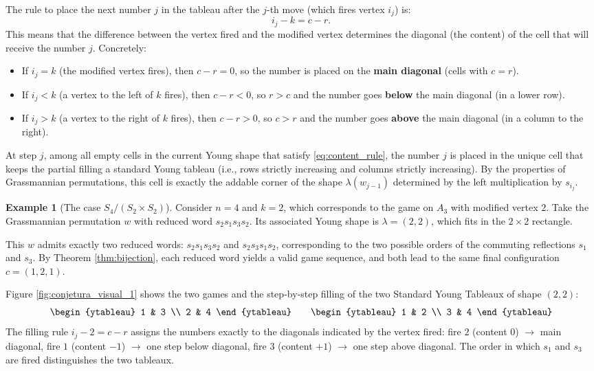 \documentclass[11pt,a4paper]{amsart}
\theoremstyle{plain}
\theoremstyle{definition}
\newtheorem{example}[theorem]{Example}
\theoremstyle{remark}
\begin{document}
The rule to place the next number $j$ in the tableau after the $j$-th move (which fires vertex $i_j$) is:
\begin{equation}\label{eq:content_rule}
    i_j - k = c - r.
\end{equation}
This means that the difference between the vertex fired and the modified vertex determines the diagonal (the content) of the cell that will receive the number $j$. Concretely:
\begin{itemize}
    \item If $i_j = k$ (the modified vertex fires), then $c - r = 0$, so the number is placed on the \textbf{main diagonal} (cells with $c = r$).
    \item If $i_j < k$ (a vertex to the left of $k$ fires), then $c - r < 0$, so $r > c$ and the number goes \textbf{below} the main diagonal (in a lower row).
    \item If $i_j > k$ (a vertex to the right of $k$ fires), then $c - r > 0$, so $c > r$ and the number goes \textbf{above} the main diagonal (in a column to the right).
\end{itemize}

At step $j$, among all empty cells in the current Young shape that satisfy \eqref{eq:content_rule}, the number $j$ is placed in the unique cell that keeps the partial filling a standard Young tableau (i.e., rows strictly increasing and columns strictly increasing). By the properties of Grassmannian permutations, this cell is exactly the addable corner of the shape $\lambda(w_{j-1})$ determined by the left multiplication by $s_{i_j}$.

\begin{example}[The case $S_4 / (S_2 \times S_2)$]
	Consider $n=4$ and $k=2$, which corresponds to the game on $A_3$ with modified vertex $2$. Take the Grassmannian permutation $w$ with reduced word $s_2 s_1 s_3 s_2$. Its associated Young shape is $\lambda = (2,2)$, which fits in the $2 \times 2$ rectangle.
	
	This $w$ admits exactly two reduced words: $s_2 s_1 s_3 s_2$ and $s_2 s_3 s_1 s_2$, corresponding to the two possible orders of the commuting reflections $s_1$ and $s_3$. By Theorem \ref{thm:bijection}, each reduced word yields a valid game sequence, and both lead to the same final configuration $c = (1,2,1)$.
	
	Figure \ref{fig:conjetura_visual_1} shows the two games and the step‑by‑step filling of the two Standard Young Tableaux of shape $(2,2)$:
	\[
	\begin{ytableau}
    1 & 3 \\
    2 & 4
    \end{ytableau}
    \qquad
    \begin{ytableau}
    1 & 2 \\
    3 & 4
    \end{ytableau}
    \]
	The filling rule $i_j - 2 = c - r$ assigns the numbers exactly to the diagonals indicated by the vertex fired: fire $2$ (content $0$) $\to$ main diagonal, fire $1$ (content $-1$) $\to$ one step below diagonal, fire $3$ (content $+1$) $\to$ one step above diagonal. The order in which $s_1$ and $s_3$ are fired distinguishes the two tableaux.
\end{example}
\end{document}
